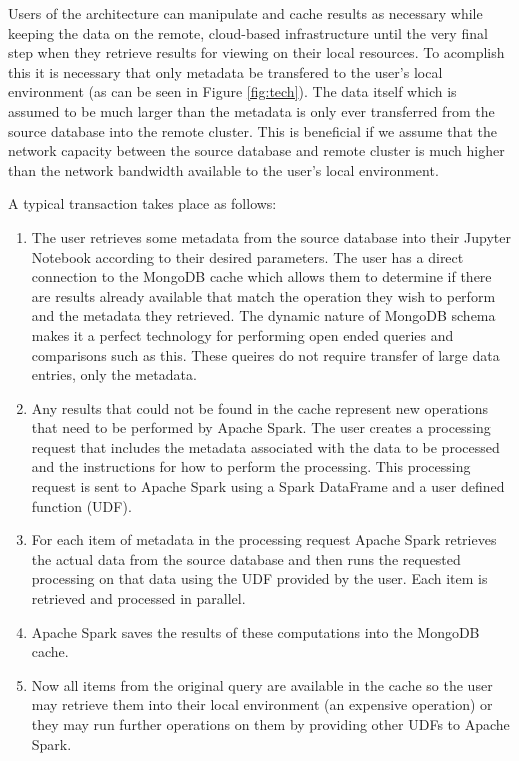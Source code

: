 \documentclass[conference,twoside]{IEEEtran}
\begin{document}
Users of the architecture can manipulate and cache results as necessary while keeping the data on the remote, cloud-based infrastructure until the very final step when they retrieve results for viewing on their local resources. To acomplish this it is necessary that only metadata be transfered to the user's local environment (as can be seen in Figure \ref{fig:tech}). The data itself which is assumed to be much larger than the metadata is only ever transferred from the source database into the remote cluster. This is beneficial if we assume that the network capacity between the source database and remote cluster is much higher than the network bandwidth available to the user's local environment.

A typical transaction takes place as follows:
\begin{enumerate}
  \item{The user retrieves some metadata from the source database into their Jupyter Notebook according to their desired parameters. The user has a direct connection to the MongoDB cache which allows them to determine if there are results already available that match the operation they wish to perform and the metadata they retrieved. The dynamic nature of MongoDB schema makes it a perfect technology for performing open ended queries and comparisons such as this. These queires do not require transfer of large data entries, only the metadata.}
  \item{Any results that could not be found in the cache represent new operations that need to be performed by Apache Spark. The user creates a processing request that includes the metadata associated with the data to be processed and the instructions for how to perform the processing. This processing request is sent to Apache Spark using a Spark DataFrame and a user defined function (UDF).}
  \item{For each item of metadata in the processing request Apache Spark retrieves the actual data from the source database and then runs the requested processing on that data using the UDF provided by the user. Each item is retrieved and processed in parallel.}\label{step:retrieve}
  \item{Apache Spark saves the results of these computations into the MongoDB cache.}
  \item{Now all items from the original query are available in the cache so the user may retrieve them into their local environment (an expensive operation) or they may run further operations on them by providing other UDFs to Apache Spark.}
\end{enumerate}
\end{document}
